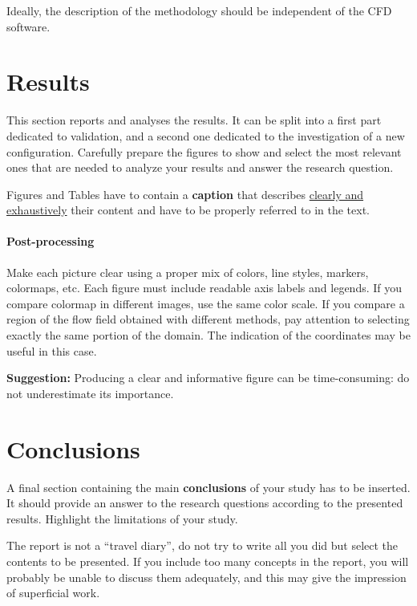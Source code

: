 \documentclass[11pt,a4paper]{article}
\begin{document}
Ideally, the description of the methodology should be independent of the CFD software.

\section{Results}
This section reports and analyses the results. It can be split into a first part dedicated to validation, and a second one dedicated to the investigation of a new configuration.
Carefully prepare the figures to show and select the most relevant ones that are needed to analyze your results and answer the research question.

Figures and Tables have to contain a \textbf{caption} that describes \underline{clearly and exhaustively} their content and have to be properly referred to in the text.


\paragraph{Post-processing} Make each picture clear using a proper mix of colors, line styles, markers, colormaps, etc. Each figure must include readable axis labels and legends. If you compare colormap in different images, use the same color scale.
If you compare a region of the flow field obtained with different methods, pay attention to selecting exactly the same portion of the domain. The indication of the coordinates may be useful in this case.

\textbf{Suggestion:} Producing a clear and informative figure can be time-consuming: do not underestimate its importance.


\section{Conclusions}
A final section containing the main \textbf{conclusions} of your study has to be inserted. It should provide an answer to the research questions according to the presented results. Highlight the limitations of your study.

The report is not a ``travel diary'', do not try to write all you did but select the contents to be presented. If you include too many concepts in the report, you will probably be unable to discuss them adequately, and this may give the impression of superficial work.
\end{document}
